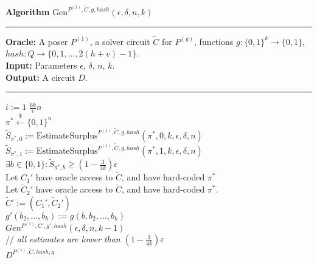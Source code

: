 %
%
\begin{codeblock}
  \textbf{Algorithm} $\text{Gen}^{P^{(1)}, \widetilde{C}, g, \mathit{hash}}(\epsilon, \delta, n, k)$
  \medskip \hrule \medskip
  \textbf{Oracle:} A poser $P^{(1)}$, a solver circuit $\widetilde{C}$ for $P^{(g)}$, functions $g: \{0,1\}^{k} \rightarrow \{0,1\}$, \\
  \IndII  $hash:Q \rightarrow \{0,1, \dots, 2(h + v) - 1\}$. \\
  \textbf{Input:}  Parameters $\epsilon$, $\delta$, $n$, $k$.\\
  \textbf{Output:} A circuit $D$.
  \medskip\hrule\medskip
  \For $i:=1$ \To $\frac{6k}{\epsilon}n$ \Do \\
  \IndI $\pi^* \xleftarrow{\$} \{0,1\}^{n}$\\
  \IndI $\widetilde{S}_{\pi^*,0} := \text{EstimateSurplus}^{P^{(1)},  \widetilde{C}, g, hash}(\pi^*, 0, k, \epsilon, \delta,n)$\\
  \IndI $\widetilde{S}_{\pi^*,1} := \text{EstimateSurplus}^{P^{(1)},  \widetilde{C}, g, hash}(\pi^*, 1, k, \epsilon, \delta,n)$\\
  \IndI \If $ \exists b \in \{0,1\}: \widetilde{S}_{\pi^*,b} \geq (1 - \frac{3}{4k}) \epsilon$ \Then \\
  \IndII Let $C_1'$ have oracle access to $\widetilde{C}$, and have hard-coded $\pi^*$ \\
  \IndII Let $\widetilde{C}_2'$ have oracle access to $\widetilde{C}$, and have hard-coded $\pi^*$. \\
  \IndII $\widetilde{C}' := (C_1', \widetilde{C}_2')$ \\
  \IndII $g'(b_2, \dots, b_k) := g(b, b_2, \dots, b_k)$\\
  \IndII\Return $Gen^{P^{(1)}, \widetilde{C}', g', hash}(\epsilon, \delta, n, k-1)$ \\
  // \textit{all estimates are lower than $(1-\frac{3}{4k})\varepsilon$}\\
  \Return $D^{P^{(1)}, \widetilde{C}, hash, g}$
\end{codeblock}

